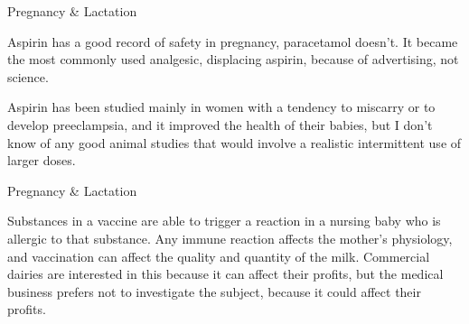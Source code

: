 \documentclass[11pt,oneside,openany,extrafontsizes]{memoir}
\begin{document}
\begin{standalonequote}{Pregnancy \& Lactation}

    \begin{answer}
      Aspirin has a good record of safety in pregnancy, paracetamol doesn't. It became the most commonly used analgesic, displacing aspirin, because of advertising, not science.

      Aspirin has been studied mainly in women with a tendency to miscarry or to develop preeclampsia, and it improved the health of their babies, but I don't know of any good animal studies that would involve a realistic intermittent use of larger doses.
    \end{answer}
\end{standalonequote}

\begin{standalonequote}{Pregnancy \& Lactation}

    \begin{answer}
      Substances in a vaccine are able to trigger a reaction in a nursing baby who is allergic to that substance. Any immune reaction affects the mother's physiology, and vaccination can affect the quality and quantity of the milk. Commercial dairies are interested in this because it can affect their profits, but the medical business prefers not to investigate the subject, because it could affect their profits.
    \end{answer}
\end{standalonequote}
\end{document}
